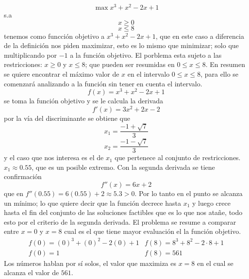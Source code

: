 \documentclass[10pt,twoside]{SelfArx} %
\begin{document}
  \begin{ejemplo}
  	\[ \max x^{3}+x^{2}-2x+1 \]
  	s.a
  	\[ x\geq0 \]
  	\[ x\leq8 \]
  	tenemos como funcción objetivo a $ x^{3}+x^{2}-2x+1 $, que en este caso a diferencia  de la definición nos piden maximizar, esto es lo mismo que minimizar; solo que multiplicando por $ -1 $ a la función objetivo. El porblema esta sujeto a las restricciones:  $ x\geq0  $ y
$  x\leq8 $; que pueden ser resumidas en $ 0\leq x\leq8 $. En resumen se quiere encontrar el máximo valor de $ x $ en el intervalo $ 0\leq x\leq8 $, para ello se comenzará analizando a la función sin tener en cuenta el intervalo.
\begin{equation}
f(x)=x^{3}+x^{2}-2x+1
\end{equation}
se toma la función objetivo y se le calcula la derivada
\begin{equation}
f'(x)=3x^{2}+2x-2
\end{equation}
por la vía del discriminante se obtiene que 
\[ x_{1}=\dfrac{-1+\sqrt{7}}{3} \]
\[ x_{2}=\dfrac{-1-\sqrt{7}}{3} \]
y el caso que nos interesa es el de $ x_{1} $ que pertenece al conjunto de restricciones. $ x_{1}\approx0.55 $, que es un posible extremo. Con la segunda derivada se tiene confirmaci\'on
\begin{equation}
f''(x)=6x+2
\end{equation}
que en $ f''(0.55)=6(0.55)+2\approx5.3>0 $. Por lo tanto en el punto se alcanza un mínimo; lo que quiere decir que la función decrece hasta $ x_{1} $ y luego crece hasta el fin del conjunto de las soluciones factibles que es lo que nos atañe, todo esto por el criterio de la segunda derivada. El problema se resume a comparar entre $ x=0 $ y  $ x=8 $ cual es el que tiene mayor evaluación el la función objetivo. 
\[ 
\begin{array}{cc}
f(0)=(0)^{3}+(0)^{2}-2(0)+1 & f(8)=8^{3}+8^{2}-2\cdot8+1\\
f(0)=1                      & f(8)=561     
\end{array}
 \]
 Los números hablan por sí solos, el valor que maximiza es $ x=8 $ en el cual se alcanza el valor de $ 561 $.
  \end{ejemplo}
  
  
  
  
  
  
  
  
  
  
  
  
  
  
  
  
  
\end{document}
